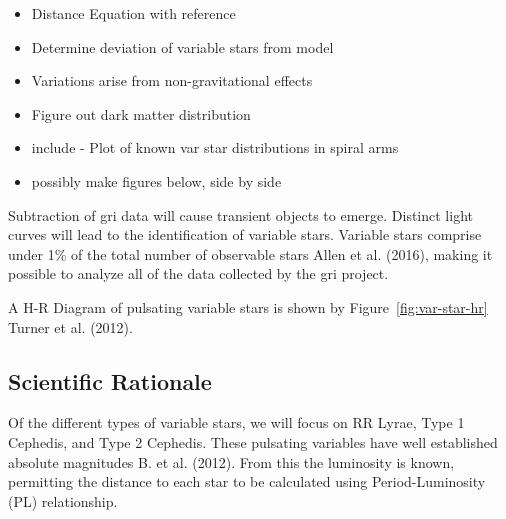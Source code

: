 \documentclass[letterpaper,11pt]{article}
\begin{document}
\begin{itemize}
	\item{} Distance Equation with reference
	\item{} Determine deviation of variable stars from model
	\item{} Variations arise from non-gravitational effects
	\item{} Figure out dark matter distribution
	\item{} include - Plot of known var star distributions in spiral arms
	\item{} possibly make figures below, side by side
\end{itemize}
Subtraction of gri data will cause transient objects to emerge.  
Distinct light curves will lead to the identification of variable stars.  
Variable stars comprise under 1\% of the total number of observable stars Allen et al. (2016), making it possible to analyze all of the data collected by the gri project.


A H-R Diagram of pulsating variable stars is shown by Figure~\ref{fig:var-star-hr} Turner et al. (2012).


\subsection{Scientific Rationale}
Of the different types of variable stars, we will focus on RR Lyrae, Type 1 Cephedis, and Type 2 Cephedis.  These pulsating variables have well established absolute magnitudes B. et al. (2012).  From this the luminosity is known, permitting the distance to each star to be calculated using Period-Luminosity (PL) relationship.
\end{document}
